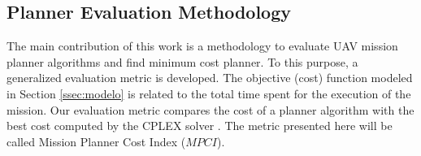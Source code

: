 \documentclass[conference,harvard,brazil,english]{sbatex}
\begin{document}
%
%
%
%
%
%
%
\subsection{Planner Evaluation Methodology}
\label{ssec:evaluationmethod}

The main contribution of this work is a methodology to evaluate UAV mission planner algorithms and find minimum cost planner. To this purpose, a generalized evaluation metric is developed. The objective (cost) function modeled in Section \ref{ssec:modelo} is related to the total time spent for the execution of the mission. Our evaluation metric compares the cost of a planner algorithm with the best cost computed by the CPLEX solver \cite{cplex2003ilog}. The metric presented here will be called Mission Planner Cost Index ($MPCI$).
\end{document}
